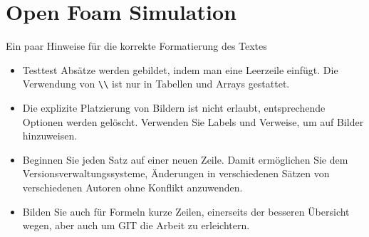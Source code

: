 %
%
%
%
\chapter{Open Foam Simulation\label{chapter:openfoam}}
\begin{refsection}

Ein paar Hinweise für die korrekte Formatierung des Textes
\begin{itemize}
\item
Testtest Absätze werden gebildet, indem man eine Leerzeile einfügt.
Die Verwendung von \verb+\\+ ist nur in Tabellen und Arrays gestattet.
\item
Die explizite Platzierung von Bildern ist nicht erlaubt, entsprechende
Optionen werden gelöscht. 
Verwenden Sie Labels und Verweise, um auf Bilder hinzuweisen.
\item
Beginnen Sie jeden Satz auf einer neuen Zeile. 
Damit ermöglichen Sie dem Versionsverwaltungssysteme, Änderungen
in verschiedenen Sätzen von verschiedenen Autoren ohne Konflikt 
anzuwenden.
\item 
Bilden Sie auch für Formeln kurze Zeilen, einerseits der besseren
Übersicht wegen, aber auch um GIT die Arbeit zu erleichtern.
\end{itemize}






\printbibliography[heading=subbibliography]
\end{refsection}
